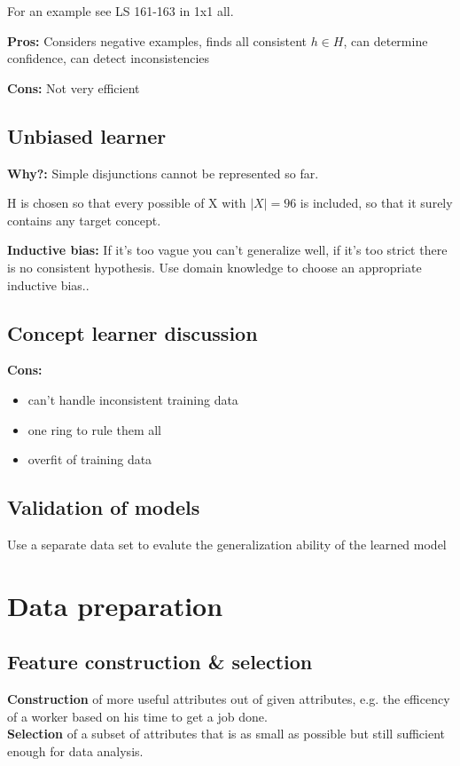 \documentclass[fleqn, oneside, 10pt, titlepage]{article}
\begin{document}
For an example see LS 161-163 in 1x1 all.

\textbf{Pros:} Considers negative examples, finds all consistent $h \in H$, can determine confidence, can detect inconsistencies

\textbf{Cons:} Not very efficient

\subsection{Unbiased learner}
\textbf{Why?: } Simple disjunctions cannot be represented so far.

H is chosen so that every possible of X with $|X| = 96$ is included, so that it surely contains any target concept.

\textbf{Inductive bias:} If it's too vague you can't generalize well, if it's too strict there is no consistent hypothesis. Use domain knowledge to choose an appropriate inductive bias..

\subsection{Concept learner discussion}
\textbf{Cons:}
\begin{itemize}
	\item can't handle inconsistent training data
	\item one ring to rule them all
	\item overfit of training data
\end{itemize}

\subsection{Validation of models}
Use a separate data set to evalute the generalization ability of the learned model

\section{Data preparation}
\subsection{Feature construction \& selection}
\textbf{Construction} of more useful attributes out of given attributes, e.g. the efficency of a worker based on his time to get a job done.\\
\textbf{Selection} of a subset of attributes that is as small as possible but still sufficient enough for data analysis.
\end{document}
